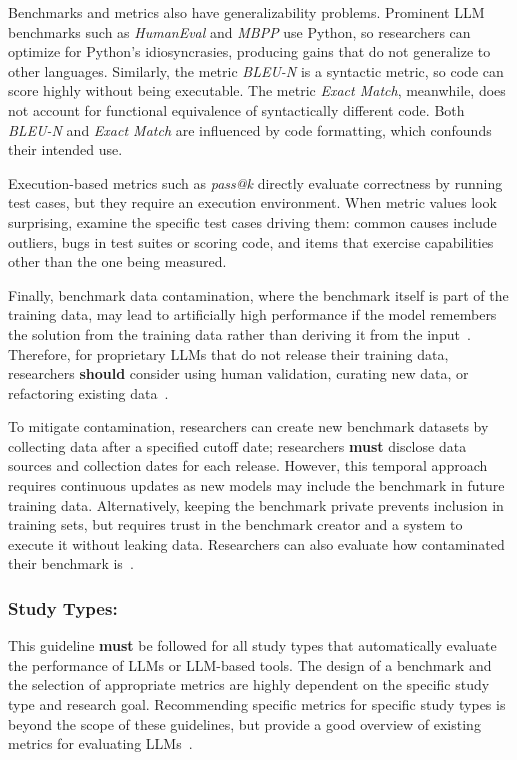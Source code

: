 \documentclass[smallextended]{svjour3}
\newcommand{\must}{\textbf{must}\xspace}
\newcommand{\should}{\textbf{should}\xspace}
\newcommand{\guidelinesubsubsection}[1]{\subsubsection{\bfseries #1:}}
\newcommand{\guidelinesubsubsection}[1]{\subsubsection{#1}}
\begin{document}
Benchmarks and metrics also have generalizability problems. Prominent LLM benchmarks such as \emph{HumanEval} and \emph{MBPP} use Python, so researchers can optimize for Python's idiosyncrasies, producing gains that do not generalize to other languages. Similarly, the metric \emph{BLEU-N} is a syntactic metric, so code can score highly without being executable. The metric \emph{Exact Match}, meanwhile, does not account for functional equivalence of syntactically different code. Both \emph{BLEU-N} and \emph{Exact Match} are influenced by code formatting, which confounds their intended use.

Execution-based metrics such as \emph{pass@k} directly evaluate correctness by running test cases, but they require an execution environment.
When metric values look surprising, examine the specific test cases driving them: common causes include outliers, bugs in test suites or scoring code, and items that exercise capabilities other than the one being measured.

Finally, benchmark data contamination, where the benchmark itself is part of the training data, may lead to artificially high performance if the model remembers the solution from the training data rather than deriving it from the input~\cite{DBLP:journals/corr/abs-2406-04244}. Therefore, for proprietary LLMs that do not release their training data, researchers \should consider using human validation, curating new data, or refactoring existing data~\cite{DBLP:journals/corr/abs-2406-04244}. 

To mitigate contamination, researchers can create new benchmark datasets by collecting data after a specified cutoff date; researchers \must disclose data sources and collection dates for each release. However, this temporal approach requires continuous updates as new models may include the benchmark in future training data. Alternatively, keeping the benchmark private prevents inclusion in training sets, but requires trust in the benchmark creator and a system to execute it without leaking data. Researchers can also evaluate how contaminated their benchmark is~\cite{DBLP:journals/corr/abs-2502-00678}.


\guidelinesubsubsection{Study Types}

This guideline \must be followed for all study types that automatically evaluate the performance of LLMs or LLM-based tools.
The design of a benchmark and the selection of appropriate metrics are highly dependent on the specific study type and research goal.
Recommending specific metrics for specific study types is beyond the scope of these guidelines, but \citeauthor{DBLP:journals/corr/abs-2505-08903} provide a good overview of existing metrics for evaluating LLMs~\cite{DBLP:journals/corr/abs-2505-08903}.
\end{document}
